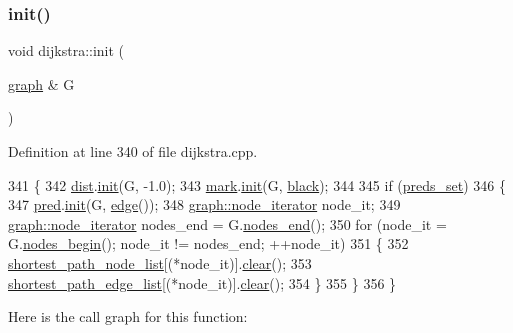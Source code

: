 \subsubsection{\texorpdfstring{init()}{init()}}
{\footnotesize\ttfamily void dijkstra\+::init (\begin{DoxyParamCaption}\item[{\mbox{\hyperlink{classgraph}{graph}} \&}]{G }\end{DoxyParamCaption})\hspace{0.3cm}{\ttfamily [private]}}



Definition at line 340 of file dijkstra.\+cpp.


\begin{DoxyCode}
341 \{
342     \mbox{\hyperlink{classdijkstra_a154cafdd5511db8f61770348ef117cda}{dist}}.\mbox{\hyperlink{classne__map_a4ef2ab4aebcb57a7a101975bf6a88e24}{init}}(G, -1.0);
343     \mbox{\hyperlink{classdijkstra_a407f98e26ca2cfb8c9ddecf4f8babdcc}{mark}}.\mbox{\hyperlink{classne__map_a4ef2ab4aebcb57a7a101975bf6a88e24}{init}}(G, \mbox{\hyperlink{classdijkstra_a2bdd8d3b57860b5715d01e65664e810fa958572ed471642bb14fce76ae9284bb5}{black}});
344     
345     \textcolor{keywordflow}{if} (\mbox{\hyperlink{classdijkstra_aaba530e703b5d4005b3c01fa1a11182d}{preds\_set}})
346     \{
347     \mbox{\hyperlink{classdijkstra_a662d982b45b2992ecf7b7f7e6696f9f9}{pred}}.\mbox{\hyperlink{classne__map_a4ef2ab4aebcb57a7a101975bf6a88e24}{init}}(G, \mbox{\hyperlink{classedge}{edge}}());
348     \mbox{\hyperlink{classgraph_a2cb374b84c133ce13f94e73c3e5da7fa}{graph::node\_iterator}} node\_it;
349     \mbox{\hyperlink{classgraph_a2cb374b84c133ce13f94e73c3e5da7fa}{graph::node\_iterator}} nodes\_end = G.\mbox{\hyperlink{classgraph_abbf9c0cb5629e98e1142254911238173}{nodes\_end}}();
350     \textcolor{keywordflow}{for} (node\_it = G.\mbox{\hyperlink{classgraph_aec053a4b509d1be804237a80044c54c0}{nodes\_begin}}(); node\_it != nodes\_end; ++node\_it)
351     \{
352         \mbox{\hyperlink{classdijkstra_a67b45d0af528737830ea559ee42c4685}{shortest\_path\_node\_list}}[(*node\_it)].\mbox{\hyperlink{classne__map_aebe555c23769c6dcc869b5ac7fae6a9c}{clear}}();
353         \mbox{\hyperlink{classdijkstra_a4c647f083ee4d12327e5c1ea3bf2e7c2}{shortest\_path\_edge\_list}}[(*node\_it)].\mbox{\hyperlink{classne__map_aebe555c23769c6dcc869b5ac7fae6a9c}{clear}}();
354     \}
355     \}
356 \}
\end{DoxyCode}
Here is the call graph for this function\+:\nopagebreak
